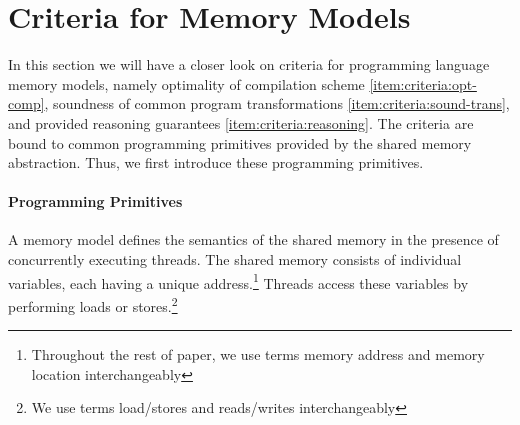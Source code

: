 \section{Criteria for Memory Models}
\label{sec:background}

In this section we will have a closer look on criteria for 
programming language memory models, 
namely optimality of compilation scheme \ref{item:criteria:opt-comp}, 
soundness of common program transformations \ref{item:criteria:sound-trans}, 
and provided reasoning guarantees \ref{item:criteria:reasoning}.  
The criteria are bound to common programming primitives 
provided by the shared memory abstraction.
Thus, we first introduce these programming primitives. 

\paragraph{Programming Primitives}
\label{sec:background:primitives}


A memory model defines the semantics of the shared memory 
in the presence of concurrently executing threads. 
The shared memory consists of individual variables, 
each having a unique address.\footnote{
Throughout the rest of paper, we use terms 
memory address and memory location interchangeably}
Threads access these variables by performing 
loads or stores.\footnote{We use terms 
load/stores and reads/writes interchangeably}

